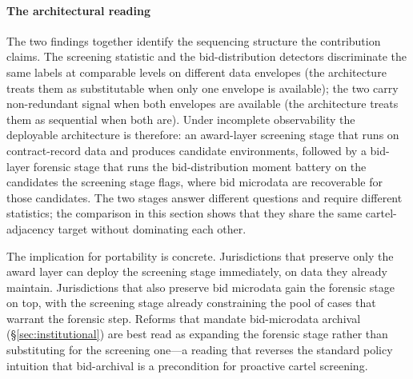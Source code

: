 \paragraph{The architectural reading}
The two findings together identify the sequencing structure
the contribution claims. The screening statistic and the
bid-distribution detectors discriminate the same labels at
comparable levels on different data envelopes (the architecture
treats them as substitutable when only one envelope is
available); the two carry non-redundant signal when both
envelopes are available (the architecture treats them as
sequential when both are). Under incomplete observability the
deployable architecture is therefore: an award-layer screening
stage that runs on contract-record data and produces candidate
environments, followed by a bid-layer forensic stage that runs
the bid-distribution moment battery on the candidates the
screening stage flags, where bid microdata are recoverable for
those candidates. The two stages answer different questions and
require different statistics; the comparison in this section
shows that they share the same cartel-adjacency target without
dominating each other.

The implication for portability is concrete. Jurisdictions that
preserve only the award layer can deploy the screening stage
immediately, on data they already maintain. Jurisdictions that
also preserve bid microdata gain the forensic stage on top, with
the screening stage already constraining the pool of cases that
warrant the forensic step. Reforms that mandate bid-microdata
archival (\S\ref{sec:institutional}) are best read as expanding
the forensic stage rather than substituting for the screening
one---a reading that reverses the standard policy intuition that
bid-archival is a precondition for proactive cartel screening.
